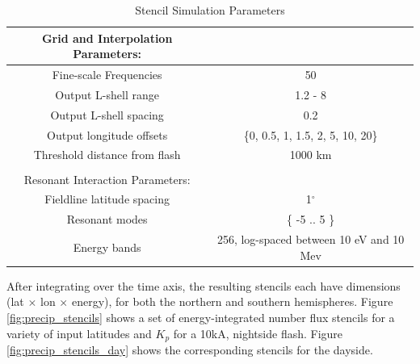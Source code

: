 \begin{table}[t]
\caption{Stencil Simulation Parameters}
\begin{center}

\begin{tabular}{c|c}
Grid and Interpolation Parameters: \\
\hline \hline
Fine-scale Frequencies & 50 \\
Output L-shell range & 1.2 - 8 \\
Output L-shell spacing & 0.2 \\
Output longitude offsets & \{0, 0.5, 1, 1.5, 2, 5, 10, 20\} \\
Threshold distance from flash & 1000 km \\
 & \\
Resonant Interaction Parameters: \\
\hline \hline
Fieldline latitude spacing & 1$^\circ$ \\
Resonant modes & \{ -5 .. 5 \} \\
Energy bands & 256, log-spaced between 10 eV and 10 Mev\end{tabular}
\end{center}
\label{tab:stencil_params}
\end{table}%

After integrating over the time axis, the resulting stencils each have dimensions (lat $\times$ lon $\times$ energy), for both the northern and southern hemispheres. Figure \ref{fig:precip_stencils} shows a set of energy-integrated number flux stencils for a variety of input latitudes and $K_p$ for a 10kA, nightside flash. Figure \ref{fig:precip_stencils_day} shows the corresponding stencils for the dayside.

